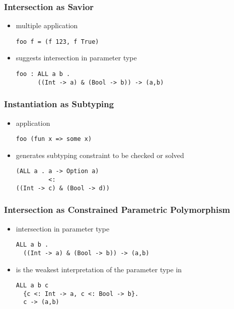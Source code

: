\documentclass{beamer}
\begin{document}
\begin{frame}[fragile]
  \frametitle{Intersection as Savior}

  \begin{itemize}
  \item multiple application
  \begin{lstlisting}
foo f = (f 123, f True)
  \end{lstlisting}
  \item suggests intersection in parameter type  
  \begin{lstlisting}
foo : ALL a b . 
      ((Int -> a) & (Bool -> b)) -> (a,b)
  \end{lstlisting}
  \end{itemize}
\end{frame}


\begin{frame}[fragile]
  \frametitle{Instantiation as Subtyping}

  \begin{itemize}
  \item application 
  \begin{lstlisting}
foo (fun x => some x)
  \end{lstlisting}
  \item generates subtyping constraint to be checked or solved 
  \begin{lstlisting}
(ALL a . a -> Option a) 
         <: 
((Int -> c) & (Bool -> d))
  \end{lstlisting}
  \end{itemize}
\end{frame}


\begin{frame}[fragile]
  \frametitle{Intersection as Constrained Parametric Polymorphism}
  \begin{itemize}
  \item intersection in parameter type 
  \begin{lstlisting}
ALL a b . 
  ((Int -> a) & (Bool -> b)) -> (a,b)
  \end{lstlisting}
  \item is the weakest interpretation of the parameter type in 
  \begin{lstlisting}
ALL a b c 
  {c <: Int -> a, c <: Bool -> b}. 
  c -> (a,b)
  \end{lstlisting}
  \end{itemize}
\end{frame}
\end{document}
